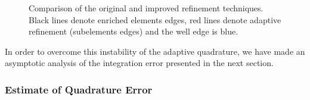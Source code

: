 \begin{figure}[!htb]
  \centering    
  \hspace{0pt}
  \caption[Adaptive refinement comparison.]
  {Comparison of the original and improved refinement techniques.
   Black lines denote enriched elements edges, red lines denote adaptive refinement (subelements edges) and the well
   edge is blue.
  }
  \label{fig:adapt_refinement}
\end{figure}
In order to overcome this instability of the adaptive quadrature, we have made an asymptotic analysis of the integration error presented 
in the next section.

\subsubsection{Estimate of Quadrature Error}

